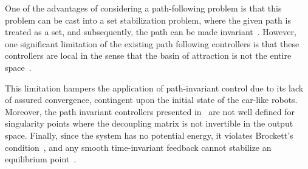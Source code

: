 One of the advantages of considering a path-following problem is that this problem can be cast into a set stabilization problem, where the given path is treated as a set, and subsequently, the path can be made invariant~\cite{ConMagNie2010,AkhNieWas2015,NieMag2008}. 
However, one significant limitation of the existing path following controllers is that these controllers are local in the sense that the basin of attraction is not the entire  space~\cite{AkhNieWas2015}. 
\begin{figure}[t]
    \centering
    \caption{}
    \vspace{-1.0cm}
    \label{fig:i}
\end{figure}
 This limitation hampers the application of path-invariant control due to its lack of assured convergence, contingent upon the initial state of the car-like robots. Moreover, the path invariant controllers presented in~\cite{AkhNieWas2015,AkhNie2011} are not well defined for singularity points {\akh  where the decoupling matrix is not invertible} in the output space. Finally, since the system  has no potential energy, it violates Brockett's condition~\cite{BrockettsCondition-1983}, and any smooth time-invariant feedback cannot stabilize an equilibrium point{\akh~\cite{ReySchMcCKol1999,LewisMurray1999,ChenKla2017}}. 

